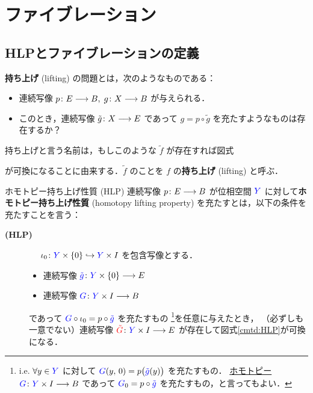 \documentclass[algtopo_main]{subfiles}
\begin{document}
\section{ファイブレーション}

\subsection{HLPとファイブレーションの定義}

\textbf{持ち上げ} (lifting) の問題とは，次のようなものである：
\begin{itemize}
    \item 連続写像 $p \colon E \longrightarrow B,\; g \colon X \longrightarrow B$ が与えられる．
    \item このとき，連続写像 $\tilde{g} \colon X \longrightarrow E$ であって $g = p \circ \tilde{g}$ を充たすようなものは存在するか？
\end{itemize}
持ち上げと言う名前は，もしこのような $\tilde{f}$ が存在すれば図式
\begin{figure}[H]
    \centering
\end{figure}
が可換になることに由来する．$\tilde{f}$ のことを $f$ の\textbf{持ち上げ} (lifting) と呼ぶ．

\begin{mydef}[label=def:HLP, breakable]{ホモトピー持ち上げ性質 (HLP)}
    連続写像 $p \colon E \longrightarrow B$ が位相空間 $\textcolor{blue}{Y}$ に対して\textbf{ホモトピー持ち上げ性質} (homotopy lifting property) を充たすとは，以下の条件を充たすことを言う：
    \begin{description}
        \item[\textbf{(HLP)}]　
        $\iota_0 \colon \textcolor{blue}{Y} \times \{0\} \hookrightarrow \textcolor{blue}{Y} \times I$ を包含写像とする．
        \begin{itemize}
            \item 連続写像 $\textcolor{blue}{\tilde{g}} \colon \textcolor{blue}{Y} \times \{0\} \longrightarrow E$
            \item 連続写像 $\textcolor{blue}{G} \colon \textcolor{blue}{Y} \times I \longrightarrow B$
        \end{itemize}
        であって $\textcolor{blue}{G} \circ \iota_0 = p \circ \textcolor{blue}{\tilde{g}}$ を充たすもの
        \footnote{i.e. $\forall y \in \textcolor{blue}{Y}$ に対して $\textcolor{blue}{G}(y,\, 0) = p \bigl( \textcolor{blue}{\tilde{g}}(y) \bigr)$ を充たすもの．
                \hyperref[def:homotopy-basic]{ホモトピー} $\textcolor{blue}{G} \colon \textcolor{blue}{Y} \times I \longrightarrow B$ であって $\textcolor{blue}{G}_0 = p \circ \textcolor{blue}{\tilde{g}}$ を充たすもの，と言ってもよい． }を任意に与えたとき，
        （必ずしも一意でない）連続写像 $\textcolor{red}{\tilde{G}} \colon \textcolor{blue}{Y} \times I \longrightarrow E$ が存在して図式\ref{cmtd:HLP}が可換になる．
    \end{description}
\end{mydef}
\end{document}
